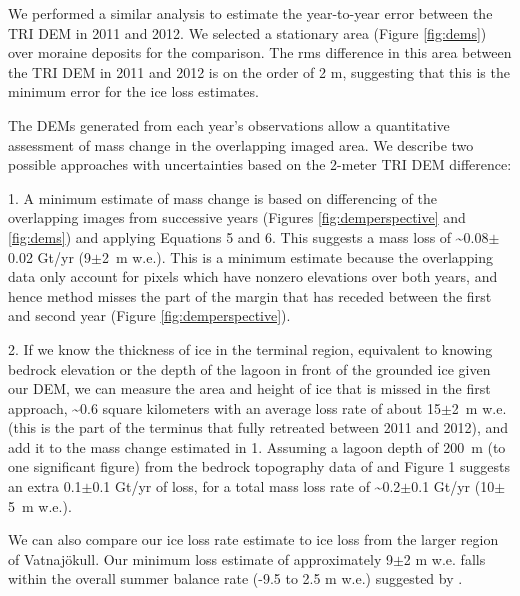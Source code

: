 We performed a similar analysis to estimate the year-to-year error between the TRI DEM in 2011 and 2012. We selected a stationary area (Figure \ref{fig:dems}) over moraine deposits for the comparison. The rms difference in this area between the TRI DEM in 2011 and 2012 is on the order of 2 m, suggesting that this is the minimum error for the ice loss estimates.

The DEMs generated from each year’s observations allow a quantitative assessment of mass change in the overlapping imaged area. We describe two possible approaches with uncertainties based on the 2-meter TRI DEM difference:

1. A minimum estimate of mass change is based on differencing of the overlapping images from successive years (Figures \ref{fig:demperspective} and \ref{fig:dems}) and applying Equations 5 and 6. This suggests a mass loss of \textasciitilde0.08$\pm$0.02 Gt/yr (9$\pm$2~m w.e.). This is a minimum estimate because the overlapping data only account for pixels which have nonzero elevations over both years, and hence method misses the part of the margin that has receded between the first and second year (Figure \ref{fig:demperspective}). 

2.  If we know the thickness of ice in the terminal region, equivalent to knowing bedrock elevation or the depth of the lagoon in front of the grounded ice given our DEM, we can measure the area and height of ice that is missed in the first approach, \textasciitilde0.6 square kilometers with an average loss rate of about 15$\pm$2~m w.e. (this is the part of the terminus that fully retreated between 2011 and 2012), and add it to the mass change estimated in 1. Assuming a lagoon depth of 200~m (to one significant figure) from the bedrock topography data of \citet{bjornsson2001jokulsarlon} and Figure 1 suggests an extra 0.1$\pm$0.1 Gt/yr of loss, for a total mass loss rate of \textasciitilde0.2$\pm$0.1 Gt/yr (10$\pm$5~m w.e.).

We can also compare our ice loss rate estimate to ice loss from the larger region of Vatnajökull. Our minimum loss estimate of approximately 9$\pm$2 m w.e. falls within the overall summer balance rate (-9.5 to 2.5 m w.e.) suggested by \citet{bjornsson2008icelandic}.




